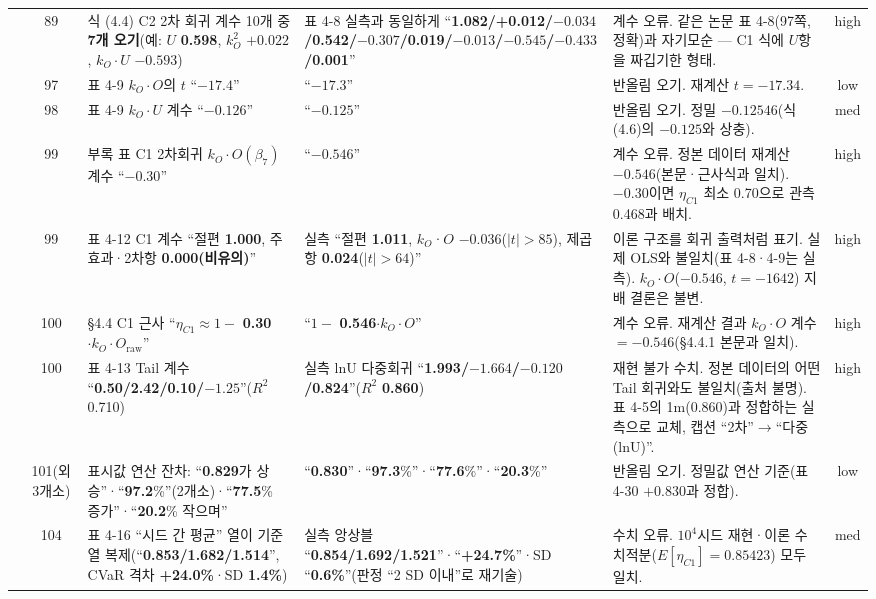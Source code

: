 \documentclass[11pt,a4paper]{article}
\newcommand{\err}[1]{{\color{errred}\textbf{#1}}}
\begin{document}
\begin{longtable}{@{}c c >{\RaggedRight}p{4.6cm} >{\RaggedRight}p{3.0cm} >{\RaggedRight}p{3.4cm} c@{}}
\addlinespace
19 & 89 & 식 (4.4) C2 2차 회귀 계수 10개 중 \err{7개 오기}(예: $U$ \err{0.598}, $k_O^2$ \err{$+0.022$}, $k_O{\cdot}U$ \err{$-0.593$}) & 표 4-8 실측과 동일하게 ``\err{1.082/+0.012/$-0.034$/0.542/$-0.307$/0.019/$-0.013$/$-0.545$/$-0.433$/0.001}'' & 계수 오류. 같은 논문 표 4-8(97쪽, 정확)과 자기모순 — C1 식에 $U$항을 짜깁기한 형태. & high \\
\addlinespace
20 & 97 & 표 4-9 $k_O\!\cdot\!O$의 $t$ ``\err{$-17.4$}'' & ``\err{$-17.3$}'' & 반올림 오기. 재계산 $t=-17.34$. & low \\
\addlinespace
21 & 98 & 표 4-9 $k_O\!\cdot\!U$ 계수 ``\err{$-0.126$}'' & ``\err{$-0.125$}'' & 반올림 오기. 정밀 $-0.12546$(식 (4.6)의 $-0.125$와 상충). & med \\
\addlinespace
22 & 99 & 부록 표 C1 2차회귀 $k_O\!\cdot\!O(\beta_7)$ 계수 ``\err{$-0.30$}'' & ``\err{$-0.546$}'' & 계수 오류. 정본 데이터 재계산 $-0.546$(본문·근사식과 일치). $-0.30$이면 $\eta_{C1}$ 최소 0.70으로 관측 0.468과 배치. & high \\
\addlinespace
23 & 99 & 표 4-12 C1 계수 ``절편 \err{1.000}, 주효과·2차항 \err{0.000(비유의)}'' & 실측 ``절편 \err{1.011}, $k_O$·$O$ \err{$-0.036$}($|t|{>}85$), 제곱항 \err{0.024}($|t|{>}64$)'' & 이론 구조를 회귀 출력처럼 표기. 실제 OLS와 불일치(표 4-8·4-9는 실측). $k_O\!\cdot\!O$($-0.546$, $t{=}-1642$) 지배 결론은 불변. & high \\
\addlinespace
24 & 100 & \S4.4 C1 근사 ``$\eta_{C1}\approx 1-$ \err{0.30}$\cdot k_O\cdot O_{\text{raw}}$'' & ``$1-$ \err{0.546}$\cdot k_O\cdot O$'' & 계수 오류. 재계산 결과 $k_O\!\cdot\!O$ 계수$=-0.546$(§4.4.1 본문과 일치). & high \\
\addlinespace
25 & 100 & 표 4-13 Tail 계수 ``\err{0.50/2.42/0.10/$-1.25$}''($R^2$ 0.710) & 실측 lnU 다중회귀 ``\err{1.993/$-1.664$/$-0.120$/0.824}''($R^2$ \err{0.860}) & 재현 불가 수치. 정본 데이터의 어떤 Tail 회귀와도 불일치(출처 불명). 표 4-5의 1m($0.860$)과 정합하는 실측으로 교체, 캡션 ``2차''$\to$``다중(lnU)''. & high \\
\addlinespace
26 & 101(외 3개소) & 표시값 연산 잔차: ``\err{0.829}가 상승''·``\err{97.2}\%''(2개소)·``\err{77.5}\% 증가''·``\err{20.2}\% 작으며'' & ``\err{0.830}''·``\err{97.3}\%''·``\err{77.6}\%''·``\err{20.3}\%'' & 반올림 오기. 정밀값 연산 기준(표 4-30 $+0.830$과 정합). & low \\
\addlinespace
27 & 104 & 표 4-16 ``시드 간 평균'' 열이 기준열 복제(``\err{0.853/1.682/1.514}'', CVaR 격차 \err{+24.0\%}·SD \err{1.4\%}) & 실측 앙상블 ``\err{0.854/1.692/1.521}''·``\err{+24.7\%}''·SD ``\err{0.6\%}''(판정 ``2 SD 이내''로 재기술) & 수치 오류. $10^4$시드 재현·이론 수치적분($E[\eta_{C1}]{=}0.85423$) 모두 일치. & med \\

\end{longtable}
\end{document}
